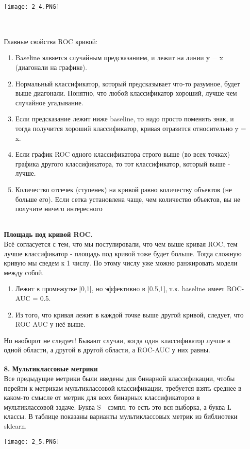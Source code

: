 \begin{center}
    \texttt{[image: 2\_4.PNG]}
\end{center}
\\
\\
Главные свойства ROC кривой:
\begin{enumerate}
    
\item Baseline ялвяется случайным предсказанием, и лежит на линии y = x (диагонали на графике).
\item  Нормальный классификатор, который предсказывает что-то разумное, будет выше диагонали. Понятно,
что любой классификатор хороший, лучше чем случайное угадывание.
\item  Если предсказание лежит ниже baseline, то надо просто поменять знак, и тогда получится хороший
классификатор, кривая отразится относительно y = x.

\item Если график ROC одного классификатора строго выше (во всех точках) графика другого классификатора, то тот классификатор, который выше - лучше.
\item
Количество отсечек (ступенек) на кривой равно количеству объектов (не больше его). Если сетка установлена чаще, чем количество объектов, вы не получите ничего интересного
\end{enumerate}
\\
\textbf{Площадь под кривой ROC.} \\
Всё согласуется с тем, что мы постулировали, что чем выше кривая ROC, тем
лучше классификатор - площадь под кривой тоже будет больше. Тогда сложную кривую мы сведем к 1 числу.
По этому числу уже можно ранжировать модели между собой.
\begin{enumerate}
    \item Лежит в промежутке [0,1], но эффективно в [0.5,1], т.к. baseline имеет ROC-AUC = 0.5.
    \item Из того, что кривая лежит в каждой точке выше другой кривой, следует, что ROC-AUC у неё выше.
\end{enumerate}
Но наоборот не следует! Бывают случаи, когда один классификатор лучше в одной области, а другой в
другой области, а ROC-AUC у них равны.
\\
\\
\textbf{8.} \textbf{Мультиклассовые метрики}\\
Все предыдущие метрики были введены для бинарной классификации, чтобы перейти к метрикам мультиклассовой классификации, требуется взять среднее в каком-то смысле от метрик для всех бинарных классификаторов в мультиклассовой задаче. Буква S - сэмпл, то есть это вся выборка, а буква L - классы. В таблице показаны варианты мультиклассовых метрик из библиотеки sklearn.
\begin{center}
    \texttt{[image: 2\_5.PNG]}
\end{center}


